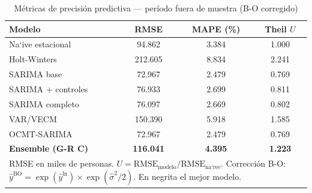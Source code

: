 \begin{table}[htbp]
\centering
\caption{M\'{e}tricas de precisi\'{o}n predictiva --- per\'{i}odo fuera de muestra (B-O corregido)}
\label{tab:metricas_8modelos}
\begin{tabular}{lccc}
\toprule
Modelo & RMSE & MAPE (\%) & Theil $U$ \\
\midrule
Na`{i}ve estacional  & 94.862 & 3.384 & 1.000 \\
Holt-Winters         & 212.605    & 8.834    & 2.241   \\
SARIMA base          & 72.967  & 2.479  & 0.769 \\
SARIMA + controles   & 76.933  & 2.699  & 0.811 \\
SARIMA completo      & 76.097  & 2.669  & 0.802 \\
VAR/VECM             & 150.390   & 5.918   & 1.585  \\
OCMT-SARIMA          & 72.967  & 2.479  & 0.769 \\
\midrule
\textbf{Ensemble (G-R C)} & \textbf{116.041} & \textbf{4.395} & \textbf{1.223} \\
\bottomrule
\multicolumn{4}{p{0.75\textwidth}}{\footnotesize RMSE en miles de personas. 
$U = \text{RMSE}_{\text{modelo}} / \text{RMSE}_{\text{na`{i}ve}}$. 
Correcci\'{o}n B-O: $\hat{y}^{\text{BO}} = \exp(\hat{y}^{\ln}) \times \exp(\hat{\sigma}^2/2)$. 
En negrita el mejor modelo.}
\end{tabular}
\end{table}
